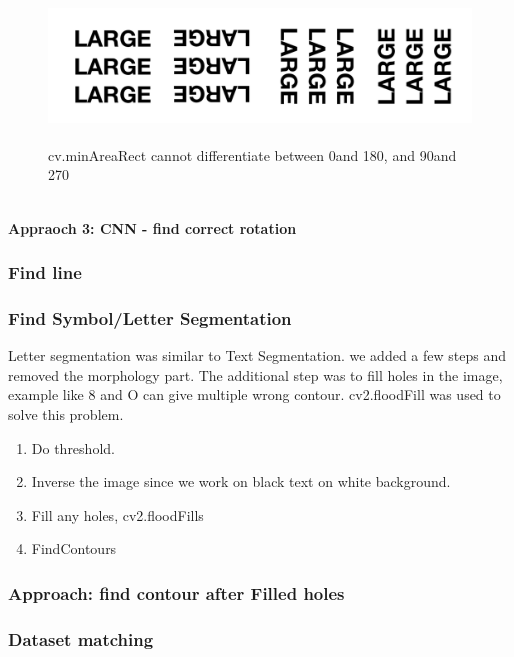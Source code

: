 \documentclass[11pt,a4paper,UKenglish]{article}
\begin{document}
\begin{figure}[H]
  \centering
  \includegraphics[height=4cm]{res/4angle_rot.png}
  \caption{cv.minAreaRect cannot differentiate between 0\textdegree and 180\textdegree, and 90\textdegree and 270\textdegree}
  \label{fig:4angle_rot}
\end{figure}


\noindent \\ \textbf{Appraoch 3: CNN - find correct rotation}
\noindent \\






\subsubsection{Find line}
\subsubsection{Find Symbol/Letter Segmentation}
Letter segmentation was similar to Text Segmentation. we added a few steps and removed the morphology part. The additional step was to fill holes in the image, example like 8 and O can give multiple wrong contour. cv2.floodFill was used to solve this problem.
\begin{enumerate}
  \item Do threshold.
  \item Inverse the image since we work on black text on white background.
  \item Fill any holes, cv2.floodFills
  \item FindContours
\end{enumerate}
\subsubsection{Approach: find contour after Filled holes}



\subsubsection{Dataset matching}
\end{document}
